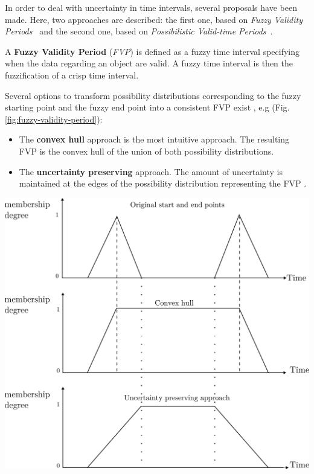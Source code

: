 In order to deal with uncertainty in time intervals, several proposals have been made. Here, two approaches are described: the first one, based on \emph{Fuzzy Validity Periods}~\cite{Garrido2009} and the second one, based on \emph{Possibilistic Valid-time Periods}~\cite{JoseEnriquePons2012}.

\begin{definition}
A \textbf{Fuzzy Validity Period}\cite{Garrido2009} (\emph{FVP}) is defined as a fuzzy time interval specifying when the data regarding an object are valid. A fuzzy time interval is then the fuzzification of a crisp time interval.\\
\end{definition}


Several options to transform possibility distributions corresponding to the fuzzy starting point and the fuzzy end point into a consistent FVP exist \cite{Garrido2009}, e.g (Fig. \ref{fig:fuzzy-validity-period}):
\begin{itemize}
\item The \textbf{convex hull} approach is the most intuitive approach. The resulting FVP is the convex hull of the union of both possibility distributions.
\item The \textbf{uncertainty preserving} approach. The amount of uncertainty is maintained at the edges of the possibility distribution representing the FVP \cite{Garrido2009}.
\end{itemize}

\begin{samepage}
\vspace*{13pt}
\begin{center}
{
\includegraphics[scale=0.25]{./graphs/comparisoncv.pdf}

}
\end{center}
\vspace*{10pt}
\end{samepage}

